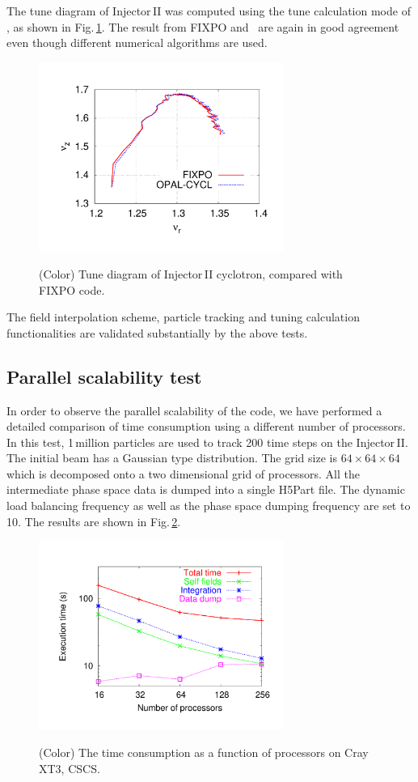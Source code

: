 \documentclass[aps,prstab,twocolumn,superscriptaddress,showpacs]{revtex4}
\begin{document}
The tune diagram of Injector\,II was computed using the tune calculation mode of \opalcycl, as shown in Fig.\,\ref{fig:nurnuz_Inj2}.
The result from FIXPO and \opalcycl \ are again in good agreement even though different numerical algorithms are used.%
\begin{figure}
  {\includegraphics[width=8cm,trim=2.5cm 2.5cm 2.5cm 2.5cm]{figures/nurnuz_Inj2.pdf}}
  \caption{(Color) Tune diagram of Injector\,II cyclotron, compared with FIXPO code.}
  \label{fig:nurnuz_Inj2}
\end{figure}

The field interpolation scheme, particle tracking and tuning calculation functionalities are validated substantially by the above tests. 
\subsection{Parallel scalability test}
In order to observe the parallel scalability of the code, we have performed a detailed comparison of time consumption using a different number of processors. 
In this test, 1\,million particles are used to track 200 time steps on the Injector\,II. The initial beam has a Gaussian
type distribution. The grid size is $64 \times 64 \times 64$ which is decomposed onto a two dimensional grid of processors. All the intermediate phase space data is dumped into 
a single H5Part file. The dynamic load balancing frequency as well as the phase space dumping frequency are set to 10.
The results are shown in Fig.\,\ref{scalability}.
\begin{figure}
  {\includegraphics[width=8cm,trim=0cm 0cm 0cm 0cm]{figures/Timing64mesh.pdf}}
  \caption{(Color) The time consumption as a function of processors on Cray XT3, CSCS.}
  \label{scalability}
\end{figure}
\end{document}
